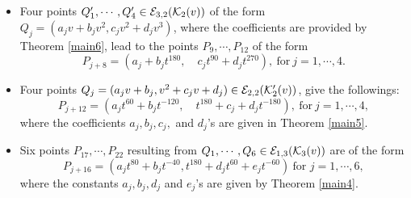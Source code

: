 \documentclass[11pt]{amsart}
\begin{document}
\begin{thm}
\begin{itemize}
				\item[(4)] Four points     $Q'_1, \cdots, Q'_4 \in {\mathcal E}_{3, 2}({\mathcal K}_2(v))$  of the form
				$Q_j=(  a_j v +b_j v^2 ,     c_j v^2 + d_j v^3 )$,
				where the coefficients are	 provided by Theorem  \ref{main6}, lead  to the points
				$P_9, \cdots, P_{12}$ of the form
			$$P_{j+8}= (  a_j  +b_j t^{180}, \quad    c_j t^{90} + d_j t^{270}), \  \text{for} \ j=1,\cdots, 4. $$
			
				

			
				\item[(5)] Four points   $Q_j=(a_j v+ b_j, v^2 + c_j v + d_j )\in {\mathcal E}_{2, 2}({\mathcal K}'_2(v))$,   give the followings:
				$$P_{j+12} = \left( a_j t^{60} + b_j t^{-120}, \quad t^{180} + c_j + d_j t^{-180} \right), \  \text{for} \ j=1,\cdots, 4,$$
				where the coefficients $a_j, b_j, c_j,$ and $d_j$'s are given in Theorem  \ref{main5}.
				 
				 
				 
				\item[(6)] Six points  $P_{17}, \cdots, P_{22}$  resulting from $Q_1, \cdots, Q_6 \in {\mathcal E}_{1, 3}({\mathcal K}_3(v))$ are of the   form
				$$P_{j+16}= \left(  a_j t^{80} + b_j  t^{-40},
		 t^{180} + d_j t^{60} + e_j t^{-60} \right)  \ \text{for } j=1,\cdots, 6,$$
			where the constants $a_j, b_j,  d_j$ and $ e_j$'s are given by Theorem \ref{main4}.
 

\end{itemize}
\end{thm}
\end{document}
